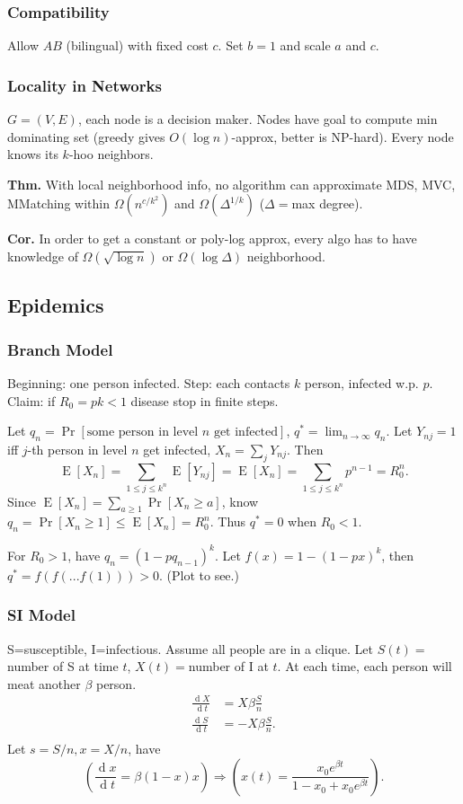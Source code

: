 \documentclass[a4paper,twocolumn,10pt]{article}
\newcommand{\pte}[1]{\left({#1}\right)}
\newcommand{\op}{\operatorname}
\newcommand{\E}{\operatorname{E}}
\newcommand{\dd}{\op{d}}
\begin{document}
	\subsubsection{Compatibility}
		Allow $AB$ (bilingual) with fixed cost $c$.
		Set $b=1$ and scale $a$ and $c$.
	
	\subsubsection{Locality in Networks}
		$G=(V,E)$, each node is a decision maker.
		Nodes have goal to compute min dominating set (greedy gives $O(\log n)$-approx,
			better is NP-hard).
		Every node knows its $k$-hoo neighbors.

		\textbf{Thm.}
		With local neighborhood info, no algorithm can approximate
			MDS, MVC, MMatching within $\Omega(n^{c/k^2})$ and $\Omega(\Delta^{1/k})$
			($\Delta=$max degree).

		\textbf{Cor.}
		In order to get a constant or poly-log approx, every algo has to  have knowledge
			of $\Omega(\sqrt{\log n})$ or $\Omega(\log \Delta)$ neighborhood.

\subsection{Epidemics}
	\subsubsection{Branch Model}
		Beginning: one person infected.
		Step: each contacts $k$ person, infected w.p. $p$.
		Claim: if $R_0=pk<1$ disease stop in finite steps.
		
		Let $q_n=\Pr[\textrm{some person in level $n$ get infected}]$,
		$q^*=\lim_{n\to\infty} q_n$.
		Let $Y_{nj}=1$ iff $j$-th person in level $n$ get infected,
			$X_n=\sum_j Y_{nj}$.
		Then 
		\[
			\E[X_n]=\sum_{1\le j\le k^{n}} \E[Y_{nj}]=
			\E[X_n]=\sum_{1\le j\le k^{n}} p^{n-1} = R_0^{n}.
		\]
		Since $\E[X_n]=\sum_{a\ge 1} \Pr[X_n\ge a]$,
			know $q_n=\Pr[X_n\ge 1]\le \E[X_n]=R_0^n$.
		Thus $q^*=0$ when $R_0<1$.
		
		For $R_0>1$, have $q_n=(1-p q_{n-1})^k$.
		Let $f(x)=1-(1-px)^k$, then $q^*=f(f(...f(1)))>0$. (Plot to see.)
	
	\subsubsection{SI Model}
		S=susceptible, I=infectious.
		Assume all people are in a clique.
		Let $S(t)=$number of S at time $t$, $X(t)=$number of I at $t$.
		At each time, each person will meat another $\beta$ person.
		\[ \begin{split}
			\frac{\dd X}{\dd t} &= X \beta \frac{S}{n} \\
			\frac{\dd S}{\dd t} &= -X \beta \frac{S}{n}. \\
		\end{split} \]
		Let $s=S/n,x=X/n$, have
		\[
			\pte{\frac{\dd x}{\dd t} = \beta(1-x)x}
			\Longrightarrow
			\pte{x(t)=\frac{x_0 e^{\beta t}}{1-x_0+x_0 e^{\beta t}}}.
		\]
	
\end{document}

